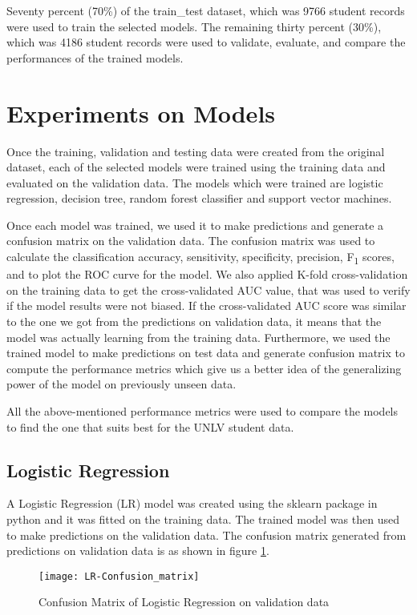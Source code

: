 \documentclass[11pt,openright]{report}
\begin{document}
Seventy percent (70\%) of the train\_test dataset, which was 9766 student records were used to train the selected models. The remaining thirty percent (30\%), which was 4186 student records were used to validate, evaluate, and compare the performances of the trained models. 

\section {Experiments on Models}
Once the training, validation and testing data were created from the original dataset, each of the selected models were trained using the training data and evaluated on the validation data. The models which were trained are logistic regression, decision tree, random forest classifier and support vector machines. 

Once each model was trained, we used it to make predictions and generate a confusion matrix on the validation data. The confusion matrix was used to calculate the classification accuracy, sensitivity, specificity, precision, F\textsubscript{1} scores, and to plot the ROC curve for the model. We also applied K-fold cross-validation on the training data to get the cross-validated AUC value, that was used to verify if the model results were not biased. If the cross-validated AUC score was similar to the one we got from the predictions on validation data, it means that the model was actually learning from the training data. Furthermore, we used the trained model to make predictions on test data and generate confusion matrix to compute the performance metrics which give us a better idea of the generalizing power of the model on previously unseen data.  

All the above-mentioned performance metrics were used to compare the models to find the one that suits best for the UNLV student data. 

\subsection {Logistic Regression}
A Logistic Regression (LR) model was created using the sklearn package in python and it was fitted on the training data. The trained model was then used to make predictions on the validation data. The confusion matrix generated from predictions on validation data is as shown in figure \ref{fig:lr_confusion_matrix}.

  \begin{figure}[!htb]
	\centering
	\texttt{[image: LR-Confusion\_matrix]}
	\caption{Confusion Matrix of Logistic Regression on validation data}
	\label{fig:lr_confusion_matrix}
\end{figure} 
\end{document}
